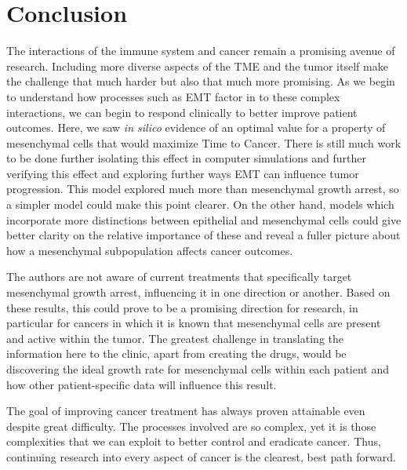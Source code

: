 \documentclass{article}
\begin{document}

\section{Conclusion}\label{Conclusion}
The interactions of the immune system and cancer remain a promising avenue of research.
Including more diverse aspects of the TME and the tumor itself make the challenge that much harder but also that much more promising.
As we begin to understand how processes such as EMT factor in to these complex interactions, we can begin to respond clinically to better improve patient outcomes.
Here, we saw {\it in silico} evidence of an optimal value for a property of mesenchymal cells that would maximize Time to Cancer.
There is still much work to be done further isolating this effect in computer simulations and further verifying this effect and exploring further ways EMT can influence tumor progression.
This model explored much more than mesenchymal growth arrest, so a simpler model could make this point clearer.
On the other hand, models which incorporate more distinctions between epithelial and mesenchymal cells could give better clarity on the relative importance of these and reveal a fuller picture about how a mesenchymal subpopulation affects cancer outcomes.

The authors are not aware of current treatments that specifically target mesenchymal growth arrest, influencing it in one direction or another.
%
Based on these results, this could prove to be a promising direction for research, in particular for cancers in which it is known that mesenchymal cells are present and active within the tumor.
The greatest challenge in translating the information here to the clinic, apart from creating the drugs, would be discovering the ideal growth rate for mesenchymal cells within each patient and how other patient-specific data will influence this result.

The goal of improving cancer treatment has always proven attainable even despite great difficulty.
The processes involved are so complex, yet it is those complexities that we can exploit to better control and eradicate cancer.
Thus, continuing research into every aspect of cancer is the clearest, best path forward.



{}

\end{document}
